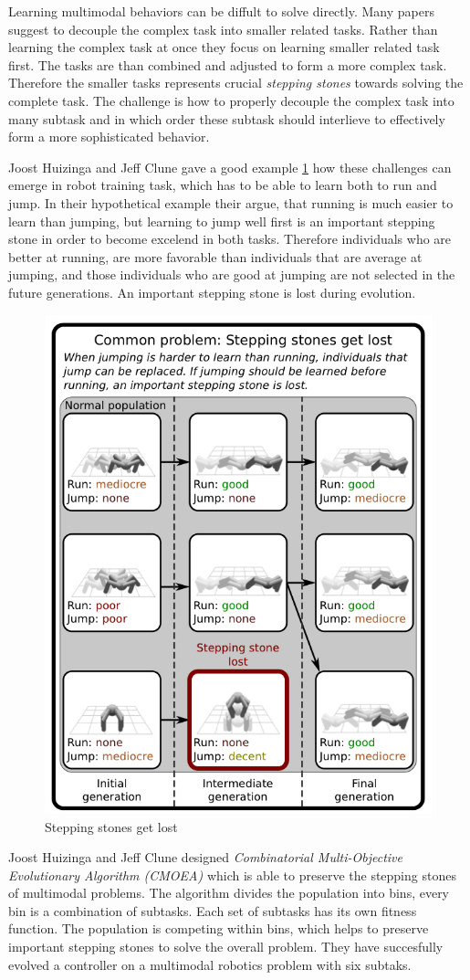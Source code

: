 \documentclass[format=acmsmall, review=false, screen=true]{acmart}
\begin{document}
Learning multimodal behaviors can be diffult to solve directly. Many papers suggest to decouple the complex task into smaller related tasks. Rather than learning the complex task at once they focus on learning smaller related task first. The tasks are than combined and adjusted to form a more complex task. Therefore the smaller tasks represents crucial \emph{stepping stones} towards solving the complete task. The challenge is how to properly decouple the complex task into many subtask and in which order these subtask should interlieve to effectively form a more sophisticated behavior.

Joost Huizinga and Jeff Clune gave a good example \ref{fig:jumping_running} how these challenges can emerge in robot training task, which has to be able to learn both to run and jump. In their hypothetical example their argue, that running is much easier to learn than jumping, but learning to jump well first is an important stepping stone in order to become excelend in both tasks. Therefore individuals who are better at running, are more favorable than individuals that are average at jumping, and those individuals who are good at jumping are not selected in the future generations. An important stepping stone is lost during evolution. 

\begin{figure}[H]
  \includegraphics[width=0.46\linewidth]{img/jumping_running.JPEG}
  \caption{\label{fig:jumping_running}Stepping stones get lost}
\end{figure}

Joost Huizinga and Jeff Clune designed \emph{Combinatorial Multi-Objective Evolutionary Algorithm (CMOEA)} which is able to preserve the stepping stones of multimodal problems. The algorithm divides the population into bins, every bin is a combination of subtasks. Each set of subtasks has its own fitness function. The population is competing within bins, which helps to preserve important stepping stones to solve the overall problem. They have succesfully evolved a controller on a multimodal robotics problem with six subtaks.
\end{document}

